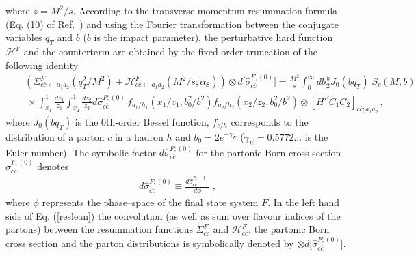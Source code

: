 \documentclass[12pt]{article}
\def\beeq{\begin{eqnarray}}
\def\eeeq{\end{eqnarray}}
\def\nn{\nonumber}
\newcommand\as{\alpha_{\mathrm{S}}}
\newcommand\f[2]{\frac{#1}{#2}}
\def\qt{q_T}
\begin{document}
where $z=M^{2}/s$. According to the transverse momentum resummation formula (Eq. (10) of Ref.~\cite{Bozzi:2005wk}) and using the Fourier transformation between the conjugate variables $q_T$ and $b$ ($b$ is the impact parameter), the perturbative hard function $\mathcal{H}^{F}$ and the counterterm are obtained by the fixed order truncation of the following identity
\beeq
\label{reslean}
&&\!\!\!\!\!\!\!\!\!\!\!\!\!\!\!\left( \Sigma^{F}_{c\bar{c}\leftarrow a_{1}a_{2}}(\qt^{2}/M^{2}) + \mathcal{H}^{F}_{c\bar{c}\leftarrow a_{1}a_{2}}(M^{2}/s;\as) \right) \otimes d\big[\hat{\sigma}^{F;(0)}_{c\bar{c}}\big] =\f{M^{2}}{s}
\int_0^\infty db \f{b}{2} J_0(bq_T)\;S_c(M,b)\\
&&\!\!\!\!\!\!\!\ \times  \int_{x_{1}}^1 \f{dz_1}{z_{1}} \int_{x_{2}}^1  \f{dz_2}{z_{2}} d\hat{\sigma}^{F;(0)}_{c\bar{c}} \,
 f_{a_{1}/h_1}\left(x_{1}/z_1,b_0^2/b^2\right)f_{a_{2}/h_2}\left(x_{2}/z_2,b_0^2/b^2\right)\otimes\left[ H^{F} C_1 C_2 \right]_{c\bar{c};a_{1}a_{2}}\,, \nn
\eeeq
where $J_0(b q_T)$ is the $0$th-order Bessel function, $f_{c/h}$ corresponds to the distribution of a parton $c$ in a hadron $h$ and $b_0=2 e^{-\gamma_E}$ ($\gamma_E=0.5772...$  is the Euler number). The symbolic factor $d\hat{\sigma}^{F;(0)}_{c\bar{c}}$ for the partonic Born cross section $\hat{\sigma}^{F;(0)}_{c\bar{c}}$ denotes
\beeq
d\hat{\sigma}^{F;(0)}_{c\bar{c}}\equiv \f{d\hat{\sigma}^{F;(0)}_{c\bar{c}}}{d\phi}\;,
\eeeq 
where $\phi$ represents the phase--space of the final state system $F$. In the left hand side of Eq. (\ref{reslean}) the convolution (as well as sum over flavour indices of the partons) between the resummation functions $\Sigma^{F}_{c\bar{c}}$ and $\mathcal{H}^{F}_{c\bar{c}}$, the partonic Born cross section and the parton distributions is symbolically denoted by $\otimes d\big[\hat{\sigma}^{F;(0)}_{c\bar{c}}\big]$.
\end{document}
